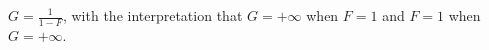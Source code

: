 $G = \frac{1}{1-F}$, with the interpretation that $G = +\infty$ when $F = 1$ and $F = 1$ when $G = +\infty$.